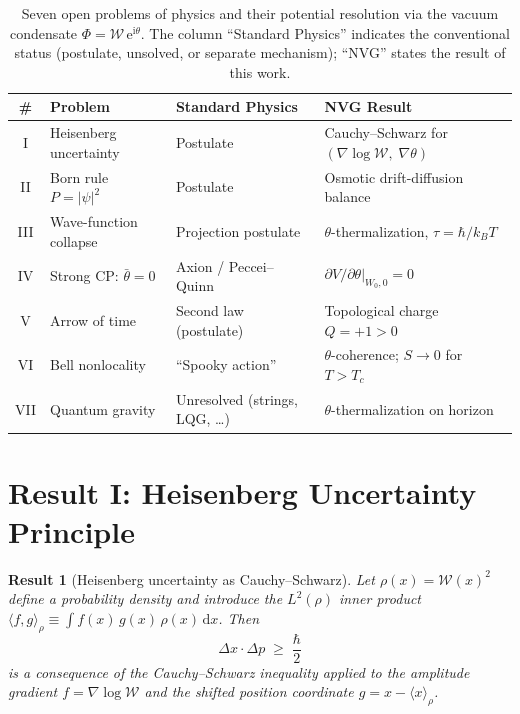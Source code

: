 \documentclass[12pt,a4paper]{article}
\theoremstyle{plain}
\newtheorem{result}{Result}
\theoremstyle{definition}
\theoremstyle{remark}
\newcommand{\hb}{\hbar}
\newcommand{\kB}{k_{\!B}}
\newcommand{\Wc}{\mathcal{W}}
\newcommand{\dd}{\mathrm{d}}
\newcommand{\ee}{\mathrm{e}}
\newcommand{\ii}{\mathrm{i}}
\begin{document}
\begin{table}[H]
\centering
\caption{Seven open problems of physics and their potential resolution
via the vacuum condensate
$\Phi = \Wc\,\ee^{\ii\theta}$.  The column ``Standard Physics''
indicates the conventional status (postulate, unsolved, or
separate mechanism); ``NVG'' states the result of this work.}
\label{tab:summary}
\footnotesize
\begin{tabular}{@{}clll@{}}
\toprule
\textbf{\#} & \textbf{Problem} & \textbf{Standard Physics}
  & \textbf{NVG Result} \\
\midrule
I   & Heisenberg uncertainty
    & Postulate
    & Cauchy--Schwarz for $(\nabla\!\log\Wc,\;\nabla\theta)$ \\[3pt]
II  & Born rule $P = |\psi|^2$
    & Postulate
    & Osmotic drift-diffusion balance \\[3pt]
III & Wave-function collapse
    & Projection postulate
    & $\theta$-thermalization, $\tau = \hb/\kB T$ \\[3pt]
IV  & Strong CP: $\bar\theta = 0$
    & Axion / Peccei--Quinn
    & $\partial V/\partial\theta\big|_{W_0,0} = 0$ \\[3pt]
V   & Arrow of time
    & Second law (postulate)
    & Topological charge $Q = +1 > 0$ \\[3pt]
VI  & Bell nonlocality
    & ``Spooky action''
    & $\theta$-coherence; $S \to 0$ for $T > T_c$ \\[3pt]
VII & Quantum gravity
    & Unresolved (strings, LQG, \dots)
    & $\theta$-thermalization on horizon \\
\bottomrule
\end{tabular}
\end{table}


\section{Result I: Heisenberg Uncertainty Principle}\label{sec:I}

\begin{result}[Heisenberg uncertainty as Cauchy--Schwarz]
\label{thm:heisenberg}
Let $\rho(x) = \Wc(x)^2$ define a probability density and
introduce the $L^2(\rho)$ inner product
$\langle f,g\rangle_\rho \equiv \int f(x)\,g(x)\,\rho(x)\,\dd x$.
Then
\begin{equation}\label{eq:HUP}
  \boxed{\;\Delta x \cdot \Delta p \;\geq\; \frac{\hb}{2}\;}
\end{equation}
is a consequence of the Cauchy--Schwarz inequality applied to the amplitude gradient $f = \nabla\!\log\Wc$ and the shifted position coordinate $g = x - \langle x \rangle_\rho$.
\end{result}
\end{document}

